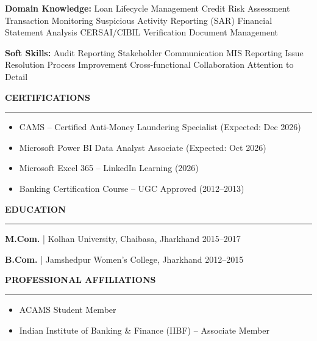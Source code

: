 \documentclass[a4paper,11pt]{article}
\begin{document}
\vspace{3pt}
\noindent\textbf{Domain Knowledge:} Loan Lifecycle Management \textbullet{} Credit Risk Assessment \textbullet{} Transaction Monitoring \textbullet{} Suspicious Activity Reporting (SAR) \textbullet{} Financial Statement Analysis \textbullet{} CERSAI/CIBIL Verification \textbullet{} Document Management

\vspace{3pt}
\noindent\textbf{Soft Skills:} Audit Reporting \textbullet{} Stakeholder Communication \textbullet{} MIS Reporting \textbullet{} Issue Resolution \textbullet{} Process Improvement \textbullet{} Cross-functional Collaboration \textbullet{} Attention to Detail

\vspace{12pt}
{\large \textbf{\textcolor{sectioncolor}{CERTIFICATIONS}}}

\vspace{2pt}
\noindent\rule{\textwidth}{1pt}

\vspace{6pt}
\begin{itemize}[leftmargin=16pt, itemsep=1pt, topsep=3pt]
\item CAMS -- Certified Anti-Money Laundering Specialist (Expected: Dec 2026)
\item Microsoft Power BI Data Analyst Associate (Expected: Oct 2026)
\item Microsoft Excel 365 -- LinkedIn Learning (2026)
\item Banking Certification Course -- UGC Approved (2012--2013)
\end{itemize}

\vspace{12pt}
{\large \textbf{\textcolor{sectioncolor}{EDUCATION}}}

\vspace{2pt}
\noindent\rule{\textwidth}{1pt}

\vspace{6pt}
\noindent\textbf{M.Com.} | Kolhan University, Chaibasa, Jharkhand \hfill 2015--2017

\vspace{3pt}
\noindent\textbf{B.Com.} | Jamshedpur Women's College, Jharkhand \hfill 2012--2015

\vspace{12pt}
{\large \textbf{\textcolor{sectioncolor}{PROFESSIONAL AFFILIATIONS}}}

\vspace{2pt}
\noindent\rule{\textwidth}{1pt}

\vspace{6pt}
\begin{itemize}[leftmargin=16pt, itemsep=1pt, topsep=3pt]
\item ACAMS Student Member
\item Indian Institute of Banking \& Finance (IIBF) -- Associate Member
\end{itemize}
\end{document}
